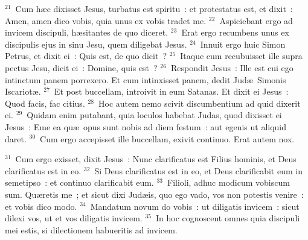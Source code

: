 ${}^{21}$~Cum h\ae c dixisset Jesus, turbatus est spiritu~: et protestatus est, et dixit~: Amen, amen dico vobis, quia unus ex vobis tradet me.
${}^{22}$~Aspiciebant ergo ad invicem discipuli, h\ae sitantes de quo diceret.
${}^{23}$~Erat ergo recumbens unus ex discipulis ejus in sinu Jesu, quem diligebat Jesus.
${}^{24}$~Innuit ergo huic Simon Petrus, et dixit ei~: Quis est, de quo dicit~?
${}^{25}$~Itaque cum recubuisset ille supra pectus Jesu, dicit ei~: Domine, quis est~?
${}^{26}$~Respondit Jesus~: Ille est cui ego intinctum panem porrexero. Et cum intinxisset panem, dedit Jud\ae\ Simonis Iscariot\ae .
${}^{27}$~Et post buccellam, introivit in eum Satanas. Et dixit ei Jesus~: Quod facis, fac citius.
${}^{28}$~Hoc autem nemo scivit discumbentium ad quid dixerit ei.
${}^{29}$~Quidam enim putabant, quia loculos habebat Judas, quod dixisset ei Jesus~: Eme ea qu\ae\ opus sunt nobis ad diem festum~: aut egenis ut aliquid daret.
${}^{30}$~Cum ergo accepisset ille buccellam, exivit continuo. Erat autem nox.


${}^{31}$~Cum ergo exisset, dixit Jesus~: Nunc clarificatus est Filius hominis, et Deus clarificatus est in eo.
${}^{32}$~Si Deus clarificatus est in eo, et Deus clarificabit eum in semetipso~: et continuo clarificabit eum.
${}^{33}$~Filioli, adhuc modicum vobiscum sum. Qu\ae retis me~; et sicut dixi Jud\ae is, quo ego vado, vos non potestis venire~: et vobis dico modo.
${}^{34}$~Mandatum novum do vobis~: ut diligatis invicem~: sicut dilexi vos, ut et vos diligatis invicem.
${}^{35}$~In hoc cognoscent omnes quia discipuli mei estis, si dilectionem habueritis ad invicem.


